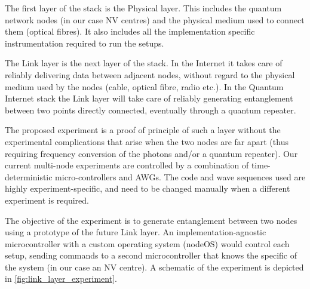\documentclass[a4paper]{article}
\begin{document}
The first layer of the stack is the Physical layer. This includes the quantum network nodes (in our case \ac{NV} centres) and the physical medium used to connect them (optical fibres). It also includes all the implementation specific instrumentation required to run the setups.

The Link layer is the next layer of the stack. In the Internet it takes care of reliably delivering data between adjacent nodes, without regard to the physical medium used by the nodes (cable, optical fibre, radio etc.).  In the Quantum Internet stack the Link layer will take care of reliably generating entanglement between two points directly connected, eventually through a quantum repeater.

The proposed experiment is a proof of principle of such a layer without the experimental complications that arise when the two nodes are far apart (thus requiring frequency conversion of the photons and/or a quantum repeater).
Our current multi-node experiments are controlled by a combination of time-deterministic micro-controllers and \acp{AWG}. The code and wave sequences used are highly experiment-specific, and need to be changed manually when a different experiment is required.

The objective of the experiment is to generate entanglement between two nodes using a prototype of the future Link layer.
An implementation-agnostic microcontroller with a custom operating system (nodeOS) would control each setup, sending commands to a second microcontroller that knows the specific of the system (in our case an NV centre). A schematic of the experiment is depicted in \autoref{fig:link_layer_experiment}.
\end{document}
